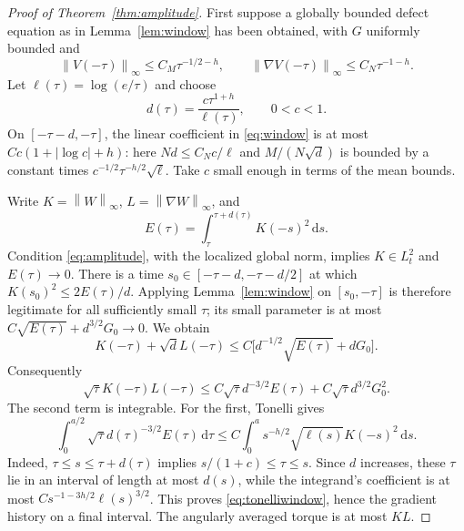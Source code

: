 \documentclass[11pt]{article}
\theoremstyle{remark}
\newcommand{\dd}{\,\mathrm d}
\newcommand{\norm}[1]{\left\lVert#1\right\rVert}
\begin{document}
\begin{proof}[Proof of Theorem~\ref{thm:amplitude}]
First suppose a globally bounded defect equation as in
Lemma~\ref{lem:window} has been obtained, with $G$ uniformly bounded and
\begin{equation}\label{eq:meanlip}
 \norm{V(-\tau)}_\infty\leq C_M\tau^{-1/2-h},\qquad
 \norm{\nabla V(-\tau)}_\infty\leq C_N\tau^{-1-h}.
\end{equation}
Let $\ell(\tau)=\log(e/\tau)$ and choose
\begin{equation}\label{eq:dwindow}
 d(\tau)=\frac{c\tau^{1+h}}{\ell(\tau)},\qquad 0<c<1.
\end{equation}
On $[-\tau-d,-\tau]$, the linear coefficient in
\eqref{eq:window} is at most $C c(1+|\log c|+h)$: here
$Nd\leq C_Nc/\ell$ and $M/(N\sqrt d)$ is bounded by a
constant times $c^{-1/2}\tau^{-h/2}\sqrt\ell$.
Take $c$ small enough in terms of the mean bounds.

Write $K=\norm W_\infty$, $L=\norm{\nabla W}_\infty$, and
\[
 E(\tau)=\int_\tau^{\tau+d(\tau)} K(-s)^2\dd s.
\]
Condition \eqref{eq:amplitude}, with the localized global norm,
implies $K\in L^2_t$ and $E(\tau)\to0$.
There is a time $s_0\in[-\tau-d,-\tau-d/2]$ at which
$K(s_0)^2\leq2E(\tau)/d$.
Applying Lemma~\ref{lem:window} on $[s_0,-\tau]$ is therefore
legitimate for all sufficiently small $\tau$; its small parameter is
at most $C\sqrt{E(\tau)}+d^{3/2}G_0\to0$.
We obtain
\begin{equation}\label{eq:smoothing}
 K(-\tau)+\sqrt d L(-\tau)
 \leq C\big[d^{-1/2}\sqrt{E(\tau)}+dG_0\big].
\end{equation}
Consequently
\begin{equation}\label{eq:product}
 \sqrt\tau K(-\tau)L(-\tau)
 \leq C\sqrt\tau d^{-3/2}E(\tau)
                         +C\sqrt\tau d^{3/2}G_0^2.
\end{equation}
The second term is integrable. For the first, Tonelli gives
\begin{equation}\label{eq:tonelliwindow}
 \int_0^{a/2}\sqrt\tau d(\tau)^{-3/2}E(\tau)\dd\tau
 \leq C\int_0^a s^{-h/2}\sqrt{\ell(s)}K(-s)^2\dd s.
\end{equation}
Indeed, $\tau\leq s\leq\tau+d(\tau)$ implies
$s/(1+c)\leq\tau\leq s$. Since $d$ increases, these $\tau$ lie
in an interval of length at most $d(s)$, while the integrand's
coefficient is at most $Cs^{-1-3h/2}\ell(s)^{3/2}$.
This proves \eqref{eq:tonelliwindow}, hence the gradient history on a
final interval. The angularly averaged torque is at most $KL$.


\end{proof}
\end{document}

